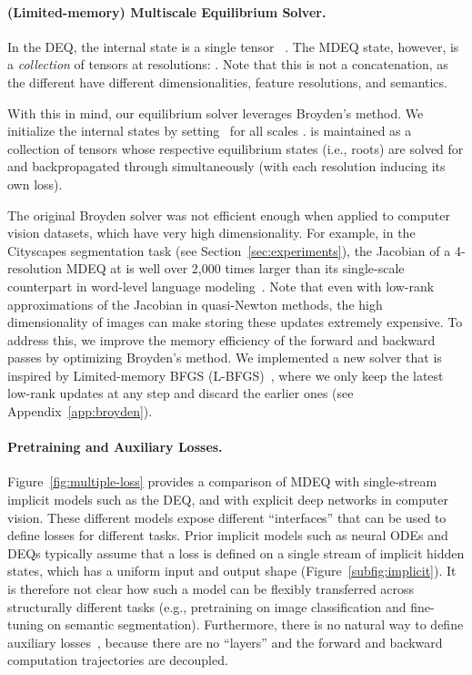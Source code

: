 \documentclass{article}
\begin{document}
\paragraph{(Limited-memory) Multiscale Equilibrium Solver.}
In the DEQ, the internal state is a single tensor ~\cite{bai2019deep}. The MDEQ state, however, is a \emph{collection} of tensors at  resolutions: . Note that this is not a concatenation, as the different  have different dimensionalities, feature resolutions, and semantics.

With this in mind, our equilibrium solver leverages Broyden's method. We initialize the internal states by setting \small\normalsize~for all scales .  is maintained as a collection of  tensors whose respective equilibrium states (i.e., roots) are solved for and backpropagated through simultaneously (with each resolution inducing its own loss).

The original Broyden solver was not efficient enough when applied to computer vision datasets, which have very high dimensionality. For example, in the Cityscapes segmentation task (see Section~\ref{sec:experiments}), the Jacobian of a 4-resolution MDEQ at  is well over 2,000 times larger than its single-scale counterpart in word-level language modeling~\cite{bai2019deep}. Note that even with low-rank approximations of the Jacobian in quasi-Newton methods, the high dimensionality of images can make storing these updates extremely expensive. To address this, we improve the memory efficiency of the forward and backward passes by optimizing Broyden's method.  We implemented a new solver that is inspired by Limited-memory BFGS (L-BFGS)~\cite{liu1989limited}, where we only keep the latest  low-rank updates at any step and discard the earlier ones (see Appendix~\ref{app:broyden}).

\vspace{-.1in}
\paragraph{Pretraining and Auxiliary Losses.}
Figure~\ref{fig:multiple-loss} provides a comparison of MDEQ with single-stream implicit models such as the DEQ, and with explicit deep networks in computer vision. These different models expose different ``interfaces'' that can be used to define losses for different tasks.
Prior implicit models such as neural ODEs and DEQs typically assume that a loss is defined on a single stream of implicit hidden states, which has a uniform input and output shape (Figure~\ref{subfig:implicit}). It is therefore not clear how such a model can be flexibly transferred across structurally different tasks (e.g., pretraining on image classification and fine-tuning on semantic segmentation). Furthermore, there is no natural way to define auxiliary losses~\cite{lee2015deeply}, because there are no ``layers'' and the forward and backward computation trajectories are decoupled.
\end{document}
